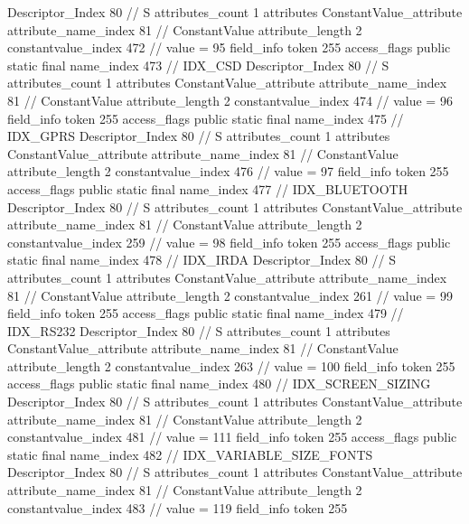 {{{{{				Descriptor_Index	80		// S
				attributes_count	1
				attributes {
				ConstantValue_attribute {
					attribute_name_index	81		// ConstantValue
					attribute_length	2
					constantvalue_index	472		// value = 95
				}
				}
			}
			field_info {
				token	255
				access_flags	public static final
				name_index	473		// IDX_CSD
				Descriptor_Index	80		// S
				attributes_count	1
				attributes {
				ConstantValue_attribute {
					attribute_name_index	81		// ConstantValue
					attribute_length	2
					constantvalue_index	474		// value = 96
				}
				}
			}
			field_info {
				token	255
				access_flags	public static final
				name_index	475		// IDX_GPRS
				Descriptor_Index	80		// S
				attributes_count	1
				attributes {
				ConstantValue_attribute {
					attribute_name_index	81		// ConstantValue
					attribute_length	2
					constantvalue_index	476		// value = 97
				}
				}
			}
			field_info {
				token	255
				access_flags	public static final
				name_index	477		// IDX_BLUETOOTH
				Descriptor_Index	80		// S
				attributes_count	1
				attributes {
				ConstantValue_attribute {
					attribute_name_index	81		// ConstantValue
					attribute_length	2
					constantvalue_index	259		// value = 98
				}
				}
			}
			field_info {
				token	255
				access_flags	public static final
				name_index	478		// IDX_IRDA
				Descriptor_Index	80		// S
				attributes_count	1
				attributes {
				ConstantValue_attribute {
					attribute_name_index	81		// ConstantValue
					attribute_length	2
					constantvalue_index	261		// value = 99
				}
				}
			}
			field_info {
				token	255
				access_flags	public static final
				name_index	479		// IDX_RS232
				Descriptor_Index	80		// S
				attributes_count	1
				attributes {
				ConstantValue_attribute {
					attribute_name_index	81		// ConstantValue
					attribute_length	2
					constantvalue_index	263		// value = 100
				}
				}
			}
			field_info {
				token	255
				access_flags	public static final
				name_index	480		// IDX_SCREEN_SIZING
				Descriptor_Index	80		// S
				attributes_count	1
				attributes {
				ConstantValue_attribute {
					attribute_name_index	81		// ConstantValue
					attribute_length	2
					constantvalue_index	481		// value = 111
				}
				}
			}
			field_info {
				token	255
				access_flags	public static final
				name_index	482		// IDX_VARIABLE_SIZE_FONTS
				Descriptor_Index	80		// S
				attributes_count	1
				attributes {
				ConstantValue_attribute {
					attribute_name_index	81		// ConstantValue
					attribute_length	2
					constantvalue_index	483		// value = 119
				}
				}
			}
			field_info {
				token	255
}}}}}
